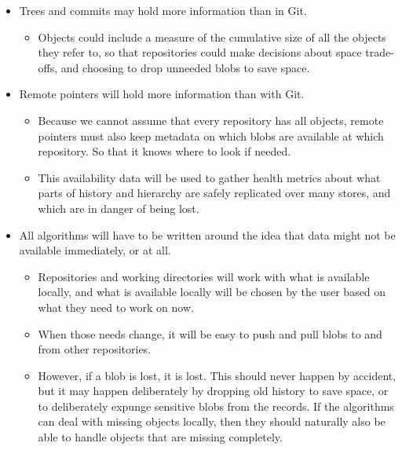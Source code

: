 \documentclass[a4paper]{article}
\begin{document}
\begin{itemize}
\item
  Trees and commits may hold more information than in Git.

  \begin{itemize}
  \item
    Objects could include a measure of the cumulative size of all the objects
    they refer to, so that repositories could make decisions about space
    trade-offs, and choosing to drop unneeded blobs to save space.
  \end{itemize}

\item
  Remote pointers will hold more information than with Git.

  \begin{itemize}
  \item
    Because we cannot assume that every repository has all objects,
    remote pointers must also keep metadata on which blobs are available
    at which repository. So that it knows where to look if needed.
  \item
    This availability data will be used to gather health metrics about
    what parts of history and hierarchy are safely replicated over many
    stores, and which are in danger of being lost.
  \end{itemize}
\item
  All algorithms will have to be written around the idea that data might
  not be available immediately, or at all.

  \begin{itemize}
  \item
    Repositories and working directories will work with what is
    available locally, and what is available locally will be chosen by
    the user based on what they need to work on now.
  \item
    When those needs change, it will be easy to push and pull blobs to
    and from other repositories.
  \item
    However, if a blob is lost, it is lost. This should never happen by
    accident, but it may happen deliberately by dropping old history to
    save space, or to deliberately expunge sensitive blobs from the
    records. If the algorithms can deal with missing objects locally,
    then they should naturally also be able to handle objects that are
    missing completely.
  \end{itemize}
\end{itemize}
\end{document}
